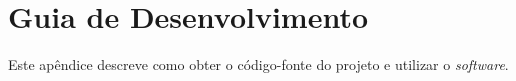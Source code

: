\apendice
\chapter{Guia de Desenvolvimento}\label{ape:guia} %

Este apêndice descreve como obter o código-fonte do projeto e utilizar o \emph{software}.

